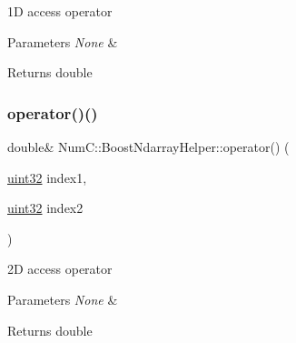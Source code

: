 1D access operator


\begin{DoxyParams}{Parameters}
{\em None} & \\
\hline
\end{DoxyParams}
\begin{DoxyReturn}{Returns}
double 
\end{DoxyReturn}
\mbox{\label{class_num_c_1_1_boost_ndarray_helper_afc3d675f295e685a7c89eead2da0d332}} 
\subsubsection{\texorpdfstring{operator()()}{operator()()}\hspace{0.1cm}{\footnotesize\ttfamily [2/3]}}
{\footnotesize\ttfamily double\& Num\+C\+::\+Boost\+Ndarray\+Helper\+::operator() (\begin{DoxyParamCaption}\item[{\mbox{\hyperlink{namespace_num_c_ae685802ca6d3035f2b400b081e3953fa}{uint32}}}]{index1,  }\item[{\mbox{\hyperlink{namespace_num_c_ae685802ca6d3035f2b400b081e3953fa}{uint32}}}]{index2 }\end{DoxyParamCaption})\hspace{0.3cm}{\ttfamily [inline]}}

2D access operator


\begin{DoxyParams}{Parameters}
{\em None} & \\
\hline
\end{DoxyParams}
\begin{DoxyReturn}{Returns}
double 
\end{DoxyReturn}
\mbox{\label{class_num_c_1_1_boost_ndarray_helper_a9424faff33849081e20aecf14713cb14}} 
